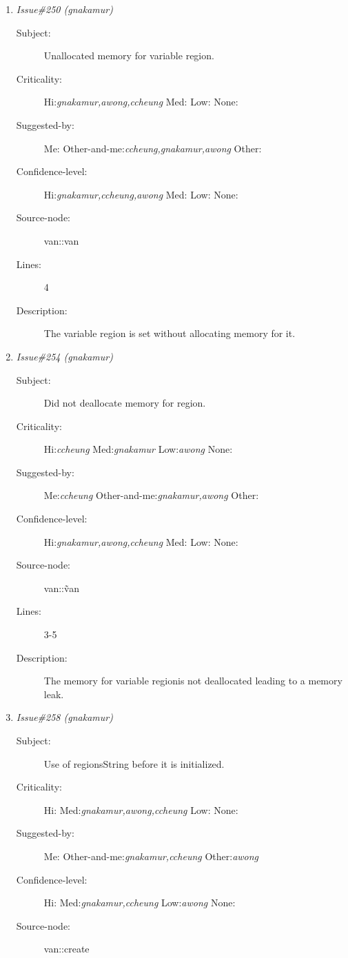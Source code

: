 \begin{enumerate}
\begin{description}
\item [Lines:] 3-7

\item [Description:] The print function from the vehicle class is
not called to print out the info inherited from that class.
\end{description}
\item {\it Issue\#250 (gnakamur)}
\begin{description}
\item [Subject:] Unallocated memory for variable region.
\item [Criticality:] Hi:{\it gnakamur,awong,ccheung} Med:{\it } Low:{\it } None:{\it }
\item [Suggested-by:] Me:{\it } Other-and-me:{\it ccheung,gnakamur,awong} Other:{\it }
\item [Confidence-level:] Hi:{\it gnakamur,ccheung,awong} Med:{\it } Low:{\it } None:{\it }
\item [Source-node:] van::van

\item [Lines:] 4

\item [Description:] The variable region is set without allocating
memory for it.
\end{description}
\item {\it Issue\#254 (gnakamur)}
\begin{description}
\item [Subject:] Did not deallocate memory for region.
\item [Criticality:] Hi:{\it ccheung} Med:{\it gnakamur} Low:{\it awong} None:{\it }
\item [Suggested-by:] Me:{\it ccheung} Other-and-me:{\it gnakamur,awong} Other:{\it }
\item [Confidence-level:] Hi:{\it gnakamur,awong,ccheung} Med:{\it } Low:{\it } None:{\it }
\item [Source-node:] van::\~van

\item [Lines:] 3-5

\item [Description:] The memory for variable regionis not
deallocated leading to a memory leak.
\end{description}
\item {\it Issue\#258 (gnakamur)}
\begin{description}
\item [Subject:] Use of regionsString before it is initialized.
\item [Criticality:] Hi:{\it } Med:{\it gnakamur,awong,ccheung} Low:{\it } None:{\it }
\item [Suggested-by:] Me:{\it } Other-and-me:{\it gnakamur,ccheung} Other:{\it awong}
\item [Confidence-level:] Hi:{\it } Med:{\it gnakamur,ccheung} Low:{\it awong} None:{\it }
\item [Source-node:] van::create


\end{description}
\end{enumerate}
